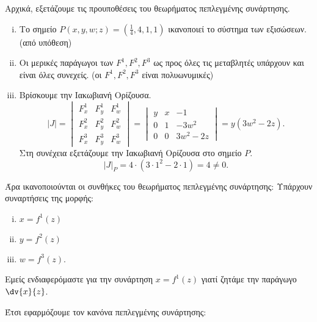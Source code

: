 \begin{solution}
  Αρχικά, εξετάζουμε τις προυποθέσεις του θεωρήματος πεπλεγμένης συνάρτησης.
  \begin{enumerate}[i)]
    \item Το σημείο $P(x,y,w;z)=(\frac{1}{4},4,1,1)$ ικανοποιεί το σύστημα των 
      εξισώσεων.  (από υπόθεση) 
    \item Οι μερικές παράγωγοι των $F^1, F^2, F^3$ ως προς όλες τις μεταβλητές υπάρχουν 
      και είναι όλες συνεχείς. (οι $F^1, F^2, F^3$ είναι πολυωνυμικές)
    \item Βρίσκουμε την Ιακωβιανή Ορίζουσα.
      \[
        |J|=
        \begin{vmatrix}
          F^1_x & F^1_y & F^1_w \\
          F^2_x & F^2_y & F^2_w \\
          F^3_x & F^3_y & F^3_w
          \end{vmatrix} = \begin{vmatrix}
          y & x & -1 \\
          0 & 1 & -3w^2 \\
          0 & 0 & 3w^2-2z
        \end{vmatrix}= y(3w^2-2z).
      \]
      Στη συνέχεια εξετάζουμε την Ιακωβιανή Ορίζουσα στο σημείο $P$.
      \[
        |J|_P=4\cdot(3\cdot 1^2-2\cdot 1)=4\neq 0.
      \]
  \end{enumerate}

  Άρα ικανοποιούνται οι συνθήκες του θεωρήματος πεπλεγμένης συνάρτησης:
  Υπάρχουν συναρτήσεις της μορφής:

  \begin{enumerate}[i)]
    \item $x=f^1(z)$
    \item $y=f^2(z)$
    \item $w=f^3(z)$.
  \end{enumerate}

  Εμείς ενδιαφερόμαστε για την συνάρτηση $x=f^1(z)$ γιατί ζητάμε την παράγωγο 
  $\dv{x}{z}$.

  Έτσι εφαρμόζουμε τον κανόνα πεπλεγμένης συνάρτησης:


\end{solution}
